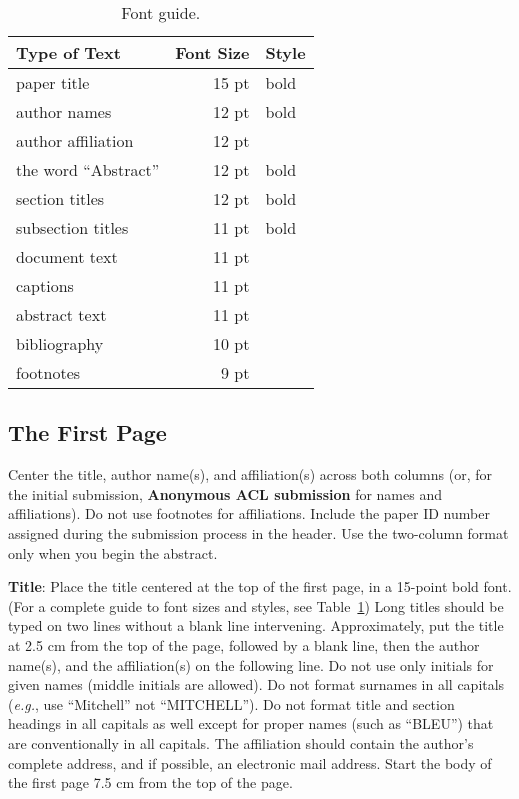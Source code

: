 \documentclass[11pt,a4paper]{article}
\begin{document}
\begin{table}[t!]
\begin{center}
\begin{tabular}{|l|rl|}
\hline \bf Type of Text & \bf Font Size & \bf Style \\ \hline
paper title & 15 pt & bold \\
author names & 12 pt & bold \\
author affiliation & 12 pt & \\
the word ``Abstract'' & 12 pt & bold \\
section titles & 12 pt & bold \\
subsection titles & 11 pt & bold \\
document text & 11 pt  &\\
captions & 11 pt & \\
abstract text & 11 pt & \\
bibliography & 10 pt & \\
footnotes & 9 pt & \\
\hline
\end{tabular}
\end{center}
\caption{\label{font-table} Font guide. }
\end{table}

\subsection{The First Page}
\label{ssec:first}

Center the title, author name(s), and affiliation(s) across both
columns (or, for the initial submission, \textbf{Anonymous ACL submission} for names and affiliations). Do not use footnotes for affiliations. 
Include the paper ID number assigned during the submission process in the header. 
Use the two-column format only when you begin the abstract.

\textbf{Title}: Place the title centered at the top of the first page, in
a 15-point bold font. (For a complete guide to font sizes and styles,
see Table~\ref{font-table}) Long titles should be typed on two lines
without a blank line intervening. Approximately, put the title at 2.5
cm from the top of the page, followed by a blank line, then the
author name(s), and the affiliation(s) on the following line. Do not
use only initials for given names (middle initials are allowed). Do
not format surnames in all capitals ({\em e.g.}, use ``Mitchell'' not
``MITCHELL'').  Do not format title and section headings in all
capitals as well except for proper names (such as ``BLEU'') that are
conventionally in all capitals.  The affiliation should contain the
author's complete address, and if possible, an electronic mail
address. Start the body of the first page 7.5 cm from the top of the
page.
\end{document}
